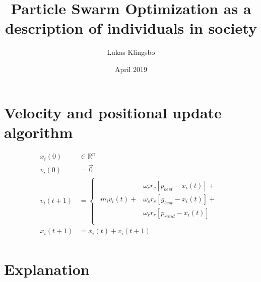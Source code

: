 \documentclass[28pt]{article}
\title{Particle Swarm Optimization as a description of individuals in society}
\author{Lukas Klingsbo}
\date{April 2019}
\begin{document}
\maketitle

\section{Velocity and positional update algorithm}

{\huge
\begin{align*}
x_i(0) &\in \mathbb{R}^n\\
v_i(0) &= \vec{0}\\
v_i(t+1) &=
\begin{cases}
  \begin{aligned}
                    &\omega_{c}r_c[p_{best}-x_i(t)] +\\
    m_{i}v_{i}(t) + &\omega_{s}r_s[g_{best}-x_i(t)] +\\
                    &\omega_{r}r_r[p_{rand}-x_i(t)] \\
  \end{aligned}
\end{cases}\\
x_i(t+1) &= x_i(t)+v_i(t+1)\\
\end{align*}
}%

\newpage
\section{Explanation}
\end{document}
